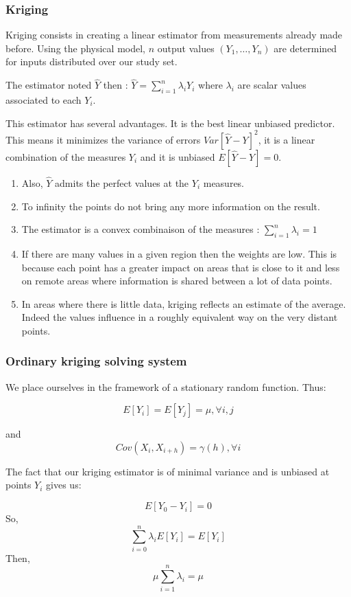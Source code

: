 \documentclass[hidelinks,12pt]{article}
\begin{document}
\subsubsection{Kriging}

Kriging consists in creating a linear estimator from measurements already made before. Using the physical model, $n$ output values $(Y_1,\ldots,Y_n)$ are determined for inputs distributed over our study set. 

The estimator noted $\hat{Y}$ then : $\hat{Y}=\sum_{i=1}^{n}\lambda_i Y_i$ where $\lambda_i$ are scalar values associated to each $Y_i$.

This estimator has several advantages. It is the best linear unbiased predictor. This means it minimizes the variance of errors $Var[\hat{Y}-Y]^2$, it is a linear combination of the measures $Y_i$ and it is unbiased $E[\hat{Y}-Y]=0$.
\begin{enumerate}
\item Also, $\hat{Y}$ admits the perfect values at the $Y_i$ measures.
\item To infinity the points do not bring any more information on the result.
\item The estimator is a convex combinaison of the measures : $\sum_{i=1}^{n}\lambda_i=1$
\item If there are many values in a given region then the weights are low. This is because each point has a greater impact on areas that is close to it and less on remote areas where information is shared between a lot of data points.
\item In areas where there is little data, kriging reflects an estimate of the average. Indeed the values influence in a roughly equivalent way on the very distant points.
\end{enumerate}

\subsubsection{Ordinary kriging solving system}
We place ourselves in the framework of a stationary random function. Thus:

$$E[Y_i]=E[Y_j]=\mu, \forall i,j$$

and $$Cov(X_i,X_{i+h})=\gamma(h), \forall i$$

The fact that our kriging estimator is of minimal variance and is unbiased at points $Y_i$ gives us:

$$E[Y_0-Y_i]=0$$
So, $$\sum_{i=0}^{n}\lambda_iE[Y_i]=E[Y_i]$$
Then, $$\mu \sum_{i=1}^{n}\lambda_i = \mu$$
\end{document}
